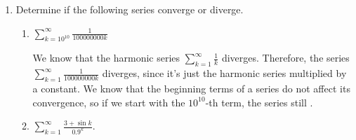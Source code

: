 \documentclass[main]{subfiles}
\begin{document}
\begin{enumerate}
\begin{enumerate}
      \item 
      \begin{problem}[1in]
      $\displaystyle \sum_{k=37}^\infty \frac{5 + 3\sin k}{2^k}$.
      \end{problem}

      \begin{solution}
      Here, the same type of intuitive reasoning as in the previous part
      leads us to guess that the series converges.  So, we need to think
      of a larger series to compare with.  Here is a complete argument:

      For all $k>0$, $\displaystyle 0 < \frac{5 + 3 \sin k}{2^k} \leq
      \frac{5 + 3(1)}{2^k} = \frac{8}{2^k}$.  We know $\displaystyle \sum \frac{8}{2^k}$
      converges, since it's 8 times the series $\displaystyle \sum \frac{1}{2^k}$, which we know is a convergent geometric series.  So, the Direct Comparison Test says that
      $\displaystyle \sum \frac{5 + 3\sin k}{2^k}$ , too. 
      \end{solution}
      
            \end{enumerate}       
\pspace{\newpage}

\item Determine if the following series converge or diverge.
\begin{enumerate}
  \item 
    \begin{problem}[1in]
    $\displaystyle \sum_{k = 10^{10}}^\infty \frac{1}{100000000k}$
        \end{problem}

    \begin{solution}
    We know that the harmonic series $\displaystyle \sum_{k=1}^\infty
    \frac{1}{k}$ diverges.  Therefore, the series $\displaystyle
    \sum_{k=1}^\infty \frac{1}{100000000k}$ diverges, since it's just the
    harmonic series multiplied by a constant.  We know that the beginning
    terms of a series do not affect its convergence, so if we start with
    the $10^{10}$-th term, the series still .
    \end{solution}

   
    \item
      \begin{problem}[1in]
      $\displaystyle \sum_{k=1}^\infty \frac{3 + \sin k}{0.9^k}$.
      \end{problem}


\end{enumerate}
\end{enumerate}
\end{document}
